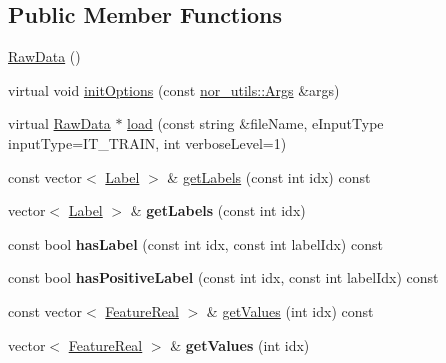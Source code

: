 \subsection*{Public Member Functions}
\begin{DoxyCompactItemize}
\item 
\hyperlink{classMultiBoost_1_1RawData_a7631e7187502b371bc39f66a6bd9c577}{Raw\-Data} ()
\item 
virtual void \hyperlink{classMultiBoost_1_1RawData_a18d5e9743af495405f271561ff705b29}{init\-Options} (const \hyperlink{classnor__utils_1_1Args}{nor\-\_\-utils\-::\-Args} \&args)
\item 
virtual \hyperlink{classMultiBoost_1_1RawData}{Raw\-Data} $\ast$ \hyperlink{classMultiBoost_1_1RawData_afc63acdb2dc93c84c90ff9ecc3143b69}{load} (const string \&file\-Name, e\-Input\-Type input\-Type=I\-T\-\_\-\-T\-R\-A\-I\-N, int verbose\-Level=1)
\item 
const vector$<$ \hyperlink{structMultiBoost_1_1Label}{Label} $>$ \& \hyperlink{classMultiBoost_1_1RawData_a629b23b663cebeb8d06214cb7e7d66fb}{get\-Labels} (const int idx) const 
\item 
\hypertarget{classMultiBoost_1_1RawData_a51773dda76f55fe89875eec147d348f9}{vector$<$ \hyperlink{structMultiBoost_1_1Label}{Label} $>$ \& {\bfseries get\-Labels} (const int idx)}\label{classMultiBoost_1_1RawData_a51773dda76f55fe89875eec147d348f9}

\item 
\hypertarget{classMultiBoost_1_1RawData_a989917bd16ef31f451632a41940fb6a4}{const bool {\bfseries has\-Label} (const int idx, const int label\-Idx) const }\label{classMultiBoost_1_1RawData_a989917bd16ef31f451632a41940fb6a4}

\item 
\hypertarget{classMultiBoost_1_1RawData_a1c4188b5d1c6d0f95d6b5dc9b65f6732}{const bool {\bfseries has\-Positive\-Label} (const int idx, const int label\-Idx) const }\label{classMultiBoost_1_1RawData_a1c4188b5d1c6d0f95d6b5dc9b65f6732}

\item 
const vector$<$ \hyperlink{Defaults_8h_a3a11cfe6a5d469d921716ca6291e934f}{Feature\-Real} $>$ \& \hyperlink{classMultiBoost_1_1RawData_ae2815b9fd5b7817f9628952134847c88}{get\-Values} (int idx) const 
\item 
\hypertarget{classMultiBoost_1_1RawData_a0f4628b6cdbce3d965bfc790849e807e}{vector$<$ \hyperlink{Defaults_8h_a3a11cfe6a5d469d921716ca6291e934f}{Feature\-Real} $>$ \& {\bfseries get\-Values} (int idx)}\label{classMultiBoost_1_1RawData_a0f4628b6cdbce3d965bfc790849e807e}


\end{DoxyCompactItemize}
